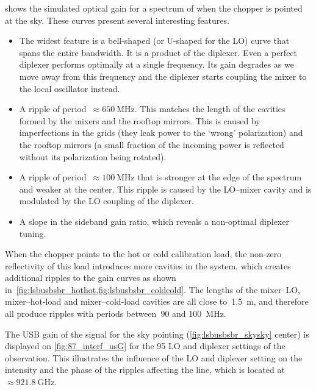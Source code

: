  shows the simulated optical gain for a spectrum of  when the chopper is pointed at the sky.
These curves present several interesting features.
\begin{itemize}[noitemsep,nolistsep]
    \item The widest feature is a bell-shaped (or U-shaped for the LO) curve that spans the entire bandwidth.  It is a product of the diplexer.  Even a perfect diplexer performs optimally at a single frequency.  Its gain degrades as we move away from this frequency and the diplexer starts coupling the mixer to the local oscillator instead.
    \item A ripple of period~$\approx \SI{650}{\mega\hertz}$.
    This matches the length of the cavities formed by the mixers and the rooftop mirrors.
    This is caused by imperfections in the grids (they leak power to the `wrong' polarization) and the rooftop mirrors (a small fraction of the incoming power is reflected without its polarization being rotated).
    \item A ripple of period~$\approx \SI{100}{\mega\hertz}$ that is stronger at the edge of the spectrum and weaker at the center.
    This ripple is caused by the LO--mixer cavity and is modulated by the LO coupling of the diplexer.
    \item A slope in the sideband gain ratio, which reveals a non-optimal diplexer tuning.
\end{itemize}

When the chopper points to the hot or cold calibration load, the non-zero reflectivity of this load introduces more cavities in the system, which creates additional ripples to the gain curves as shown in~\cref{fig:lsbusbsbr_hothot,fig:lsbusbsbr_coldcold}.
The lengths of the mixer--LO, mixer--hot-load and mixer--cold-load cavities are all close to~\SI{1.5}{\meter}, and therefore all produce ripples with periods between~\num{90} and \SI{100}{\mega\hertz}.

The USB gain of the signal for the sky pointing (\cref{fig:lsbusbsbr_skysky} center) is displayed on \cref{fig:87_interf_usG} for the 95 LO and diplexer settings of the  observation.
This illustrates the influence of the LO and diplexer setting on the intensity and the phase of the ripples affecting the line, which is located at~$\approx \SI{921.8}{\giga\hertz}$.

